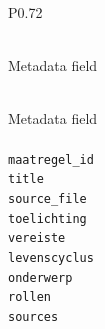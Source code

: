 \begingroup
\small
\setlength{\tabcolsep}{4pt}
\renewcommand{\arraystretch}{1.08}
\setlength{\LTcapwidth}{\textwidth}
\setlength{\LTleft}{0pt plus 1fill}
\setlength{\LTright}{0pt plus 1fill}
\begin{longtable}{P{0.72\textwidth}}
\caption{Metadata fields present in Algoritmekader maatregelen files.} \label{tab:algoritmekader-maatregelen-metadata-fields} \\
\toprule
Metadata field \\
\midrule
\endfirsthead
\caption[]{Metadata fields present in Algoritmekader maatregelen files.} \\
\toprule
Metadata field \\
\midrule
\endhead
\midrule
{} \\
\midrule
\endfoot
\bottomrule
\endlastfoot
\texttt{maatregel\_\allowbreak{}id} \\
\texttt{title} \\
\texttt{source\_\allowbreak{}file} \\
\texttt{toelichting} \\
\texttt{vereiste} \\
\texttt{levenscyclus} \\
\texttt{onderwerp} \\
\texttt{rollen} \\
\texttt{sources} \\
\end{longtable}
\endgroup
